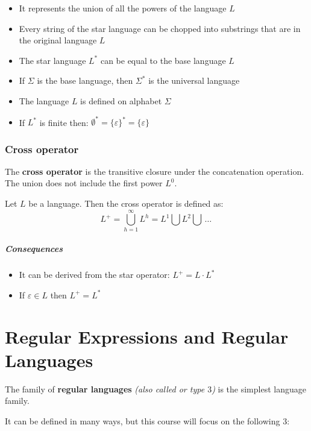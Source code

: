 \documentclass[english]{article}
\begin{document}
\begin{itemize}
  \item It represents the union of all the powers of the language \(L\)
  \item Every string of the star language can be chopped into substrings that are in the original language \(L\)
  \item The star language \(L^\ast\) can be equal to the base language \(L\)
  \item If \(\Sigma\) is the base language, then \(\Sigma^\ast\) is the universal language
  \item The language \(L\) is defined on alphabet \(\Sigma\)
  \item If \(L^\ast\) is finite then: \(\emptyset^\ast = \{\varepsilon\}^\ast = \{\varepsilon\}\)
\end{itemize}

\subsubsection{Cross operator}

The \textbf{cross operator} is the transitive closure under the concatenation operation.
The union does not include the first power \(L^0\).

\begin{definition}
  Let \(L\) be a language.
  Then the cross operator is defined as:
  \[ L^+ = \bigcup_{h=1}^{\infty} L^h = L^1 \bigcup L^2 \bigcup\,\ldots\,\]
\end{definition}

\subparagraph*{Consequences}

\begin{itemize}
  \item It can be derived from the star operator: \(L^+ = L \cdot L^\ast\)
  \item If \(\varepsilon \in L\) then \(L^+ = L^\ast\)
\end{itemize}

\clearpage

\section{Regular Expressions and Regular Languages}

The family of \textbf{regular languages} \textit{(also called \REG or type \(3\))} is the simplest language family.

It can be defined in many ways, but this course will focus on the following \(3\):
\end{document}
